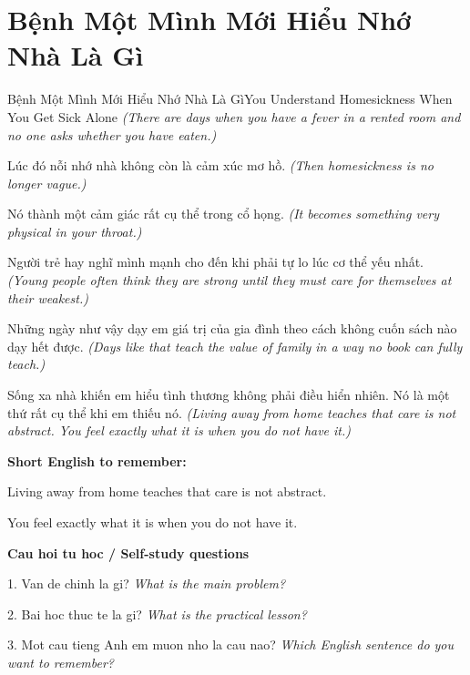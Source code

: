 \section{Bệnh Một Mình Mới Hiểu Nhớ Nhà Là Gì}
\begin{truyen}{Bệnh Một Mình Mới Hiểu Nhớ Nhà Là Gì}{You Understand Homesickness When You Get Sick Alone}
\textit{(There are days when you have a fever in a rented room and no one asks whether you have eaten.)}

Lúc đó nỗi nhớ nhà không còn là cảm xúc mơ hồ.
\textit{(Then homesickness is no longer vague.)}

Nó thành một cảm giác rất cụ thể trong cổ họng.
\textit{(It becomes something very physical in your throat.)}

Người trẻ hay nghĩ mình mạnh cho đến khi phải tự lo lúc cơ thể yếu nhất.
\textit{(Young people often think they are strong until they must care for themselves at their weakest.)}

Những ngày như vậy dạy em giá trị của gia đình theo cách không cuốn sách nào dạy hết được.
\textit{(Days like that teach the value of family in a way no book can fully teach.)}

\end{truyen}

\begin{baihoc}
Sống xa nhà khiến em hiểu tình thương không phải điều hiển nhiên. Nó là một thứ rất cụ thể khi em thiếu nó.
\textit{(Living away from home teaches that care is not abstract. You feel exactly what it is when you do not have it.)}
\end{baihoc}

\begin{ghinhoanh}
\textbf{Short English to remember:}

Living away from home teaches that care is not abstract.

You feel exactly what it is when you do not have it.

\end{ghinhoanh}

\begin{tuhocnhanh}
\textbf{Cau hoi tu hoc / Self-study questions}

1. Van de chinh la gi? \textit{What is the main problem?}

2. Bai hoc thuc te la gi? \textit{What is the practical lesson?}

3. Mot cau tieng Anh em muon nho la cau nao? \textit{Which English sentence do you want to remember?}
\end{tuhocnhanh}
\ngancach


